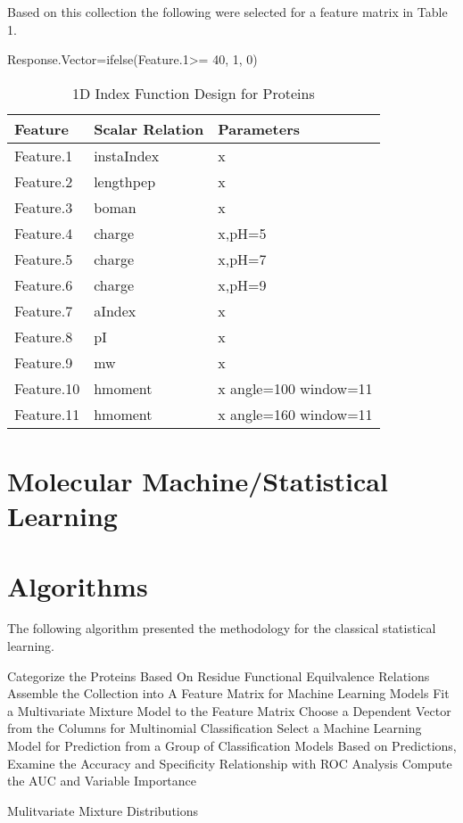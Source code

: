 Based on this collection the following were selected for a feature matrix in Table 1.

Response.Vector=ifelse(Feature.1>= 40, 1, 0)

\begin{table}[H]\tiny
  \caption{1D Index Function Design for Proteins }
\begin{tabular}{p{1cm}p{1cm}p{5cm}}
\hline 
Feature & Scalar Relation & Parameters \\
\hline 
Feature.1 & instaIndex & x \\
Feature.2 & lengthpep & x \\
Feature.3 & boman & x \\
\hline 
Feature.4 & charge & x,pH=5 \\
Feature.5 & charge & x,pH=7 \\
Feature.6 & charge & x,pH=9 \\
\hline 
Feature.7 & aIndex & x \\
Feature.8 & pI & x \\
Feature.9 & mw & x \\
\hline 
Feature.10 & hmoment & x angle=100 window=11 \\
Feature.11 & hmoment & x angle=160 window=11 \\
\hline
\end{tabular}
\end{table}

\section{Molecular Machine/Statistical Learning}

\section{Algorithms}

The following algorithm presented the methodology for the classical statistical learning.
\footnotesize
\begin{algorithm}[H]
\begin{algorithmic}[1]
\State Categorize the Proteins Based On Residue Functional Equilvalence Relations
\State Assemble the Collection into A Feature Matrix for Machine Learning Models
\State Fit a Multivariate Mixture Model to the Feature Matrix
\State Choose a Dependent Vector from the Columns for Multinomial Classification 
\State Select a Machine Learning Model for Prediction from a Group of Classification Models
\State Based on Predictions, Examine the Accuracy and Specificity Relationship with ROC Analysis
\State Compute the AUC and Variable Importance
\end{algorithmic}
\caption{ Mulitvariate Mixture Distributions }
\label{Multivariate_Distrib}
\end{algorithm}

